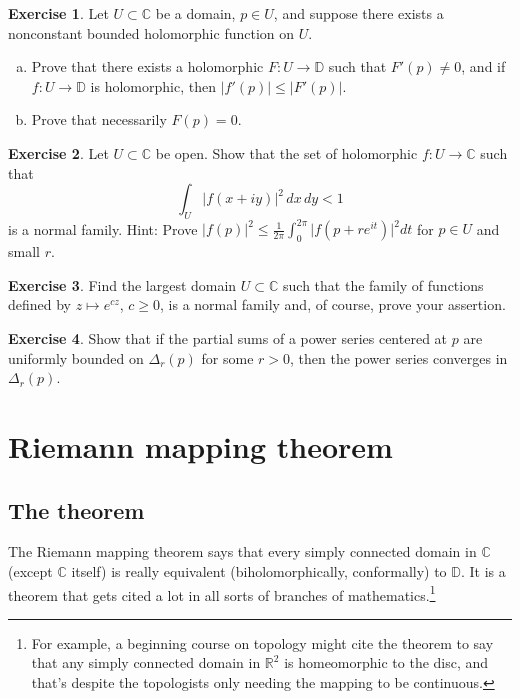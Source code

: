 \documentclass[12pt,openany]{book}
\newcommand{\sabs}[1]{\lvert {#1} \rvert}
\newcommand{\abs}[1]{\left\lvert {#1} \right\rvert}
\newcommand{\C}{{\mathbb{C}}}
\newcommand{\R}{{\mathbb{R}}}
\newcommand{\D}{{\mathbb{D}}}
\theoremstyle{plain}
\theoremstyle{remark}
\theoremstyle{definition}
\newenvironment{exbox}{%
    \def\FrameCommand{\vrule width 1pt \relax\hspace{10pt}}%
    \MakeFramed{\advance\hsize-\width\FrameRestore}%
}{%
    \endMakeFramed
}
\newenvironment{exparts}{%
    \leavevmode\begin{enumerate}[a),noitemsep,topsep=0pt,parsep=0pt,partopsep=0pt]
}{%
    \end{enumerate}
}
\theoremstyle{exercise}
\newtheorem{exercise}{Exercise}[section]
\theoremstyle{example}
\begin{document}
\begin{exbox}
\begin{exercise}
Let $U \subset \C$ be a domain, $p \in U$,
and suppose there exists a nonconstant
bounded holomorphic function on $U$.
\begin{exparts}
\item
Prove that there exists a holomorphic $F \colon U \to \D$
such that
$F'(p) \not= 0$, and if
$f \colon U \to \D$ is holomorphic,
then $\sabs{f'(p)} \leq \sabs{F'(p)}$.
\item
Prove that necessarily $F(p) = 0$.
\end{exparts}
\end{exercise}

\begin{exercise}
Let $U \subset \C$ be open.
Show that the set of holomorphic
$f \colon U \to \C$ such that
\begin{equation*}
\int_{U} \abs{f(x+iy)}^2 \, dx \, dy < 1
\end{equation*}
is a normal family.
Hint:
Prove
$\sabs{f(p)}^2 \leq
\frac{1}{2\pi} \int_{0}^{2\pi} \sabs{f(p+re^{it})}^2 dt$
for $p \in U$ and small $r$.
\end{exercise}

\begin{exercise}
Find the largest domain $U \subset \C$ such that the family
of functions defined by $z \mapsto e^{cz}$, $c \geq 0$, is a
normal family and, of course, prove your assertion.
\end{exercise}

\begin{exercise}
Show that if the partial sums of a power series centered at $p$
are uniformly bounded on $\Delta_r(p)$ for some $r > 0$,
then the power series converges in $\Delta_r(p)$.
\end{exercise}
\end{exbox}


\section{Riemann mapping theorem}
\label{sec:RMT}

\subsection{The theorem}\label{subsec:RMT}

The Riemann mapping theorem says that
every simply connected domain in $\C$ (except $\C$ itself) is really
equivalent (biholomorphically, conformally) to $\D$.
It is a theorem that gets cited a lot in all sorts of branches of
mathematics.\footnote{For example, a beginning course on topology might cite
the theorem to say that any simply connected domain in $\R^2$
is homeomorphic to the disc, and that's despite the topologists only
needing the mapping to be continuous.}
\end{document}
